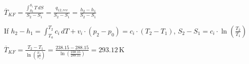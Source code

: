 \( \overline{T}_{KF} = \frac{\int_{S_2}^{S_1} T \, dS}{S_2 - S_1} = \frac{q_{12,rev}}{S_2 - S_1} = \frac{h_2 - h_1}{S_2 - S_1} \)  

If \( h_2 - h_1 = \int_{T_a}^{T_2} c_i \, dT + v_i \cdot (p_2 - p_0) = c_i \cdot (T_2 - T_1) \),  
\( S_2 - S_1 = c_i \cdot \ln \left( \frac{T_2}{T_1} \right) \)  

\( \overline{T}_{KF} = \frac{T_2 - T_1}{\ln \left( \frac{T_2}{T_1} \right)} = \frac{238.15 - 288.15}{\ln \left( \frac{238.15}{288.15} \right)} = 293.12 \, \text{K} \)